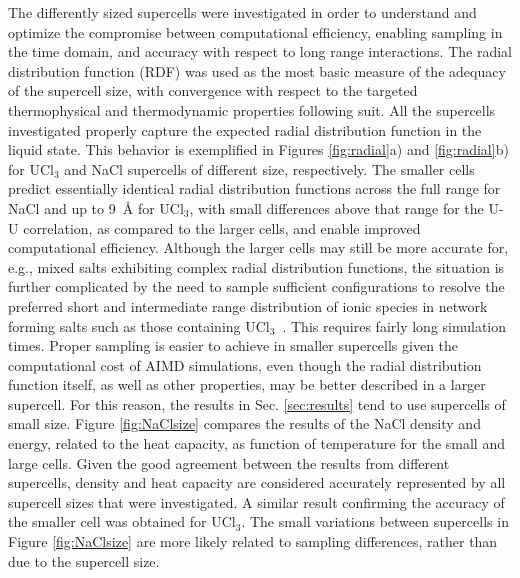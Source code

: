\documentclass[preprint,3p,10pt,onecolumn,number,sort&compress]{elsarticle}
\begin{document}
The differently sized supercells were investigated in order to understand and optimize the compromise between computational efficiency, enabling sampling in the time domain, and accuracy with respect to long range interactions. The radial distribution function (RDF) was used as the most basic measure of the adequacy of the supercell size, with convergence with respect to the targeted thermophysical and thermodynamic properties following suit. All the supercells investigated properly capture the expected radial distribution function in the liquid state. This behavior is exemplified in Figures \ref{fig:radial}a) and \ref{fig:radial}b) for UCl$_3$ and NaCl supercells of different size, respectively. The smaller cells predict essentially identical radial distribution functions across the full range for NaCl and up to 9~\AA{} for UCl$_3$, with small differences above that range for the U-U correlation, as compared to the larger cells, and enable improved computational efficiency. Although the larger cells may still be more accurate for, e.g., mixed salts exhibiting complex radial distribution functions, the situation %
is further complicated by the need to sample sufficient configurations to resolve the preferred short and intermediate range distribution of ionic species in network forming salts such as those containing UCl$_3$~\cite{Li}. This requires fairly long simulation times. Proper sampling is easier to achieve in smaller supercells given the computational cost of AIMD simulations, even though the radial distribution function itself, as well as other properties, may be better described in a larger supercell. For this reason, the results in Sec. \ref{sec:results} tend to use supercells of small size. Figure \ref{fig:NaClsize} compares the results of the NaCl density and energy, related to the heat capacity, as function of temperature for the small and large cells. Given the good agreement between the results from different supercells, density and heat capacity are considered accurately represented by all supercell sizes that were investigated. A similar result confirming the accuracy of the smaller cell was obtained for UCl$_3$.
The small variations between supercells in Figure \ref{fig:NaClsize} are more likely related to sampling differences, rather than due to the supercell size. %
\end{document}

